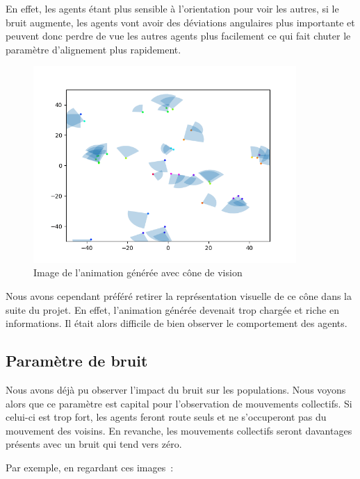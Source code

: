 \documentclass[french, a4paper, 12pt, openany]{report}
\begin{document}
		En effet, les agents étant plus sensible à l'orientation pour voir les autres, si le bruit augmente, les agents vont avoir des déviations angulaires plus importante et peuvent donc perdre de vue les autres agents plus facilement ce qui fait chuter le paramètre d'alignement plus rapidement.
	
	
   \begin{figure}[!h]
		\centering
		\includegraphics[width=10cm]{images/image_12.png}
		\caption{Image de l'animation générée avec cône de vision}
		\label{cone_vision}
	\end{figure}  
	
	Nous avons cependant préféré retirer la représentation visuelle de ce cône dans la suite du projet. En effet, l'animation générée devenait trop chargée et riche en informations. Il était alors difficile de bien observer le comportement des agents.\\  
  
  \subsection{Paramètre de bruit}
    
   Nous avons déjà pu observer l'impact du bruit sur les populations. Nous voyons alors que ce paramètre est capital pour l'observation de mouvements collectifs. Si celui-ci est trop fort, les agents feront route seuls et ne s'occuperont pas du mouvement des voisins. En revanche, les mouvements collectifs seront davantages présents avec un bruit qui tend vers zéro.

Par exemple, en regardant ces images~:
\end{document}
